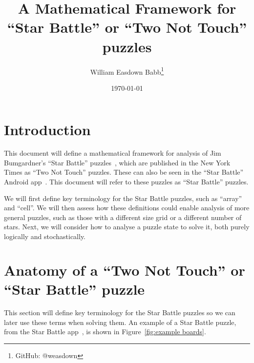 \documentclass[titlepage]{article} %
\title{A Mathematical Framework for “Star Battle” or “Two Not Touch” puzzles}
\date{\today{}}
\author{William Easdown Babb\thanks{GitHub: @weasdown}}
\begin{document}
\maketitle
\section{Introduction}
This document will define a mathematical framework for analysis of Jim Bumgardner’s “Star Battle” puzzles~\cite{krazydad}, which are published in the New York Times as “Two Not Touch” puzzles. These can also be seen in the “Star Battle” Android app~\cite{stars-app}. This document will refer to these puzzles as “Star Battle” puzzles.

We will first define key terminology for the Star Battle puzzles, such as “array” and “cell”. We will then assess how these definitions could enable analysis of more general puzzles, such as those with a different size grid or a different number of stars. Next, we will consider how to analyse a puzzle state to solve it, both purely logically and stochastically.


\pagebreak
\section{Anatomy of a “Two Not Touch” or “Star Battle” puzzle}
This section will define key terminology for the Star Battle puzzles so we can later use these terms when solving them.
An example of a Star Battle puzzle, from the Star Battle app~\cite{stars-app}, is shown in Figure~\ref{fig:example boards}.
\end{document}
